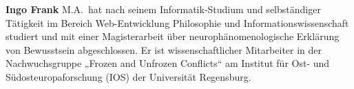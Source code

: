 \textbf{Ingo Frank} M.A.~hat nach seinem Informatik-Studium und
selbständiger Tätigkeit im Bereich Web-Entwicklung Philosophie und
Informationswissenschaft studiert und mit einer Magisterarbeit über
neurophänomenologische Erklärung von Bewusstsein abgeschlossen. Er ist
wissenschaftlicher Mitarbeiter in der Nachwuchsgruppe „Frozen and
Unfrozen Conflicts`` am Institut für Ost- und Südosteuropaforschung
(IOS) der Universität Regensburg.
